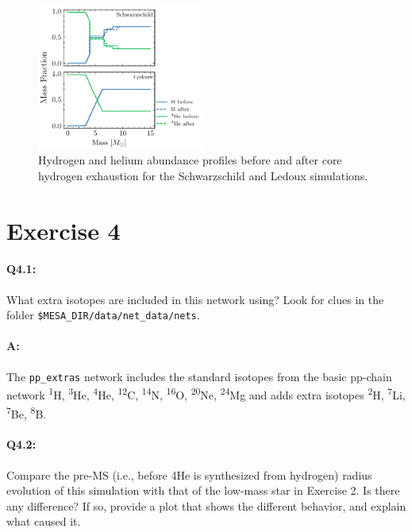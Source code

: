 \documentclass[twocolumn,fontsize=11pt]{scrartcl}
\begin{document}
\begin{figure}
    \centering
    \includegraphics[width=0.49\textwidth]{q34hydrogen_exhausted.pdf}
    \caption{Hydrogen and helium abundance profiles before and after core hydrogen exhaustion for the Schwarzschild and Ledoux simulations.}
    \label{fig:q34hydrogen_exhausted}   
\end{figure}

\clearpage
\section*{Exercise 4}

\paragraph{Q4.1:} What extra isotopes are included in this network using? Look for clues in the folder \texttt{\$MESA\_DIR/data/net\_data/nets}.

\paragraph{A:} The \texttt{pp\_extras} network includes the standard isotopes from the basic pp-chain network \textsuperscript{1}H, \textsuperscript{3}He, \textsuperscript{4}He, \textsuperscript{12}C, \textsuperscript{14}N, \textsuperscript{16}O, \textsuperscript{20}Ne, \textsuperscript{24}Mg  and adds extra isotopes \textsuperscript{2}H, \textsuperscript{7}Li, \textsuperscript{7}Be, \textsuperscript{8}B.

\paragraph{Q4.2:} Compare the pre-MS (i.e., before 4He is synthesized from hydrogen) radius evolution
of this simulation with that of the low-mass star in Exercise 2. Is there any difference?
If so, provide a plot that shows the different behavior, and explain what caused it.
\end{document}
